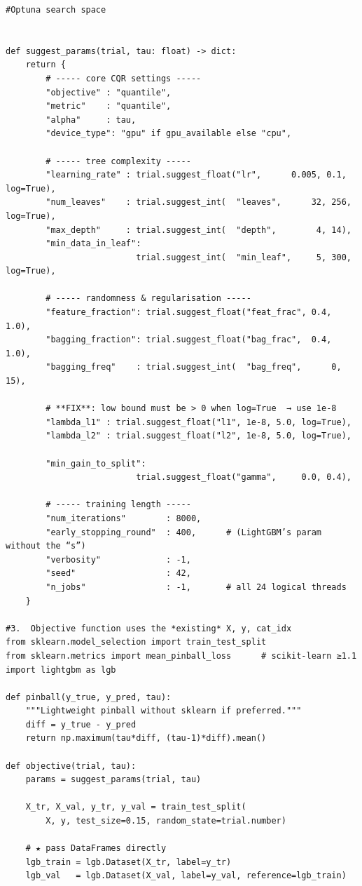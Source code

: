 \documentclass[
  a4paper,
  DIV=11,
  numbers=noendperiod]{scrreprt}
\begin{document}
\begin{verbatim}
#Optuna search space 


def suggest_params(trial, tau: float) -> dict:
    return {
        # ----- core CQR settings -----
        "objective" : "quantile",
        "metric"    : "quantile",
        "alpha"     : tau,
        "device_type": "gpu" if gpu_available else "cpu",

        # ----- tree complexity -----
        "learning_rate" : trial.suggest_float("lr",      0.005, 0.1,  log=True),
        "num_leaves"    : trial.suggest_int(  "leaves",      32, 256, log=True),
        "max_depth"     : trial.suggest_int(  "depth",        4, 14),
        "min_data_in_leaf":
                          trial.suggest_int(  "min_leaf",     5, 300, log=True),

        # ----- randomness & regularisation -----
        "feature_fraction": trial.suggest_float("feat_frac", 0.4, 1.0),
        "bagging_fraction": trial.suggest_float("bag_frac",  0.4, 1.0),
        "bagging_freq"    : trial.suggest_int(  "bag_freq",      0, 15),

        # **FIX**: low bound must be > 0 when log=True  → use 1e-8
        "lambda_l1" : trial.suggest_float("l1", 1e-8, 5.0, log=True),
        "lambda_l2" : trial.suggest_float("l2", 1e-8, 5.0, log=True),

        "min_gain_to_split":
                          trial.suggest_float("gamma",     0.0, 0.4),

        # ----- training length -----
        "num_iterations"        : 8000,
        "early_stopping_round"  : 400,      # (LightGBM’s param without the “s”)
        "verbosity"             : -1,
        "seed"                  : 42,
        "n_jobs"                : -1,       # all 24 logical threads
    }

#3.  Objective function uses the *existing* X, y, cat_idx
from sklearn.model_selection import train_test_split
from sklearn.metrics import mean_pinball_loss      # scikit-learn ≥1.1
import lightgbm as lgb

def pinball(y_true, y_pred, tau):
    """Lightweight pinball without sklearn if preferred."""
    diff = y_true - y_pred
    return np.maximum(tau*diff, (tau-1)*diff).mean()

def objective(trial, tau):
    params = suggest_params(trial, tau)

    X_tr, X_val, y_tr, y_val = train_test_split(
        X, y, test_size=0.15, random_state=trial.number)

    # ★ pass DataFrames directly
    lgb_train = lgb.Dataset(X_tr, label=y_tr)
    lgb_val   = lgb.Dataset(X_val, label=y_val, reference=lgb_train)


\end{verbatim}
\end{document}
